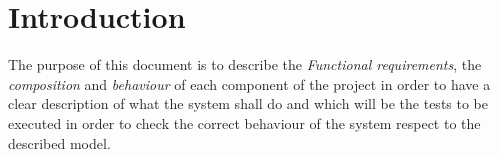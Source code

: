 \section{Introduction}
The purpose of this document is to describe the \textit{Functional requirements}, the \textit{composition} and \textit{behaviour} of each component of the project in order to have a clear 
description of what the system shall do and which will be the tests to be executed in order to check the correct behaviour of the system respect to the described model.